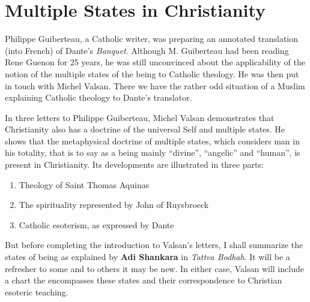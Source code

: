 \section{Multiple States in Christianity}

Philippe Guiberteau, a Catholic writer, was preparing an annotated translation (into French) of Dante's \emph{Banquet}. Although M. Guiberteau had been reading Rene Guenon for 25 years, he was still unconvinced about the applicability of the notion of the multiple states of the being to Catholic theology. He was then put in touch with Michel Valsan. There we have the rather odd situation of a Muslim explaining Catholic theology to Dante's translator.

In three letters to Philippe Guiberteau, Michel Valsan demonstrates that Christianity also has a doctrine of the universal Self and multiple states. He shows that the metaphysical doctrine of multiple states, which considers man in his totality, that is to say as a being mainly “divine”, “angelic” and “human”, is present in Christianity. Its developments are illustrated in three parts:

\begin{enumerate}
\item Theology of Saint Thomas Aquinas 
\item The spirituality represented by John of Ruysbroeck 
\item Catholic esoterism, as expressed by Dante 
\end{enumerate}
But before completing the introduction to Valsan's letters, I shall summarize the states of being as explained by \textbf{Adi Shankara} in \emph{Tattva Bodhah}. It will be a refresher to some and to others it may be new. In either case, Valsan will include a chart the encompasses these states and their correspondence to Christian esoteric teaching.

